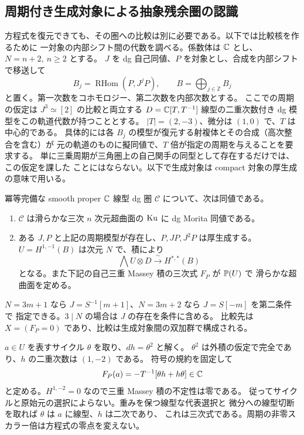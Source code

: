 \subsection{周期付き生成対象による抽象残余圏の認識}
\label{cog:sec:recognition}
方程式を復元できても、その圏への比較は別に必要である。以下では比較核を作るために
一対象の内部シフト間の代数を調べる。係数体は $\mathbb C$ とし、$N=n+2,\ n\ge2$ とする。
$J$ を dg 自己同値、$P$ を対象とし、合成を内部シフトで移送して
\[
 B_j=\operatorname{RHom}(P,J^jP),\qquad B=\bigoplus_{j\in\mathbb Z}B_j
\]
と置く。第一次数をコホモロジー、第二次数を内部次数とする。
ここでの周期の仮定は $J^3\simeq[2]$ の比較と両立する
$D=\mathbb C[T,T^{-1}]$ 線型の二重次数付き dg 模型をこの軌道代数が持つこととする。
$|T|=(2,-3)$、微分は $(1,0)$ で、$T$ は中心的である。
具体的には各 $B_j$ の模型が復元する射複体とその合成（高次整合を含む）が
元の軌道のものに擬同値で、$T$ 倍が指定の周期を与えることを要求する。
単に三乗周期が三角圏上の自己関手の同型として存在するだけでは、この仮定を課した
ことにはならない。以下で生成対象は compact 対象の厚生成の意味で用いる。

\begin{theorem}\label{cog:thm:recognition}
冪等完備な smooth proper $\mathbb C$ 線型 dg 圏 $\mathcal C$ について、次は同値である。
\begin{enumerate}
\item $\mathcal C$ は滑らかな三次 $n$ 次元超曲面の $\operatorname{Ku}$ に dg Morita 同値である。
\item ある $J,P$ と上記の周期模型が存在し、$P,JP,J^2P$ は厚生成する。
$U=H^{1,-1}(B)$ は次元 $N$ で、積により
\[
               \bigwedge U\otimes D\xrightarrow{\ \sim\ }H^{*,*}(B)
\]
となる。また下記の自己三重 Massey 積の三次式 $F_P$ が $\mathbb P(U)$ で
滑らかな超曲面を定める。
\end{enumerate}
$N=3m+1$ なら $J=S^{-1}[m+1]$、$N=3m+2$ なら $J=S[-m]$ を第二条件で
指定できる。$3\mid N$ の場合は $J$ の存在を条件に含める。
比較先は $X=(F_P=0)$ であり、比較は生成対象間の双加群で構成される。
\end{theorem}

$a\in U$ を表すサイクル $\theta$ を取り、$dh=\theta^2$ と解く。
$\theta^2$ は外積の仮定で完全であり、$h$ の二重次数は $(1,-2)$ である。
符号の規約を固定して
\[
                 F_P(a)=-T^{-1}[\theta h+h\theta]\in\mathbb C
\]
と定める。$H^{1,-2}=0$ なので三重 Massey 積の不定性は零である。
従ってサイクルと原始元の選択によらない。重みを保つ線型な代表選択と
微分への線型切断を取れば $\theta$ は $a$ に線型、$h$ は二次であり、
これは三次式である。周期の非零スカラー倍は方程式の零点を変えない。

